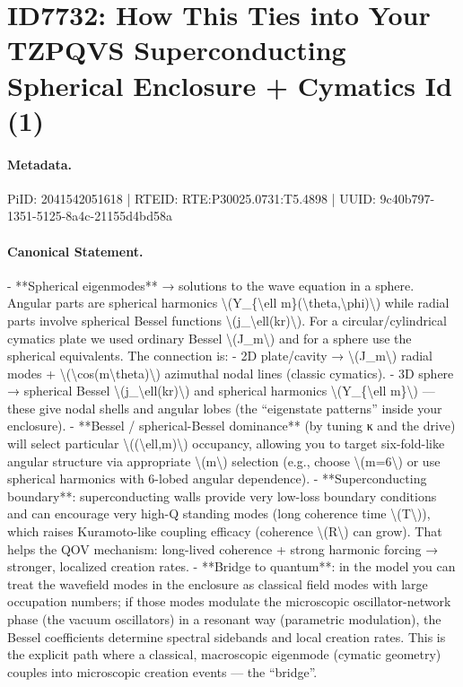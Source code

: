 \section*{ID7732: How This Ties into Your TZPQVS Superconducting Spherical Enclosure + Cymatics Id (1)}
\paragraph{Metadata.}
PiID: 2041542051618 | RTEID: RTE:P30025.0731:T5.4898 | UUID: 9c40b797-1351-5125-8a4c-21155d4bd58a

\paragraph{Canonical Statement.}
- **Spherical eigenmodes** → solutions to the wave equation in a sphere. Angular parts are spherical harmonics \textbackslash{}(Y\_\{\textbackslash{}ell m\}(\textbackslash{}theta,\textbackslash{}phi)\textbackslash{}) while radial parts involve spherical Bessel functions \textbackslash{}(j\_\textbackslash{}ell(kr)\textbackslash{}). For a circular/cylindrical cymatics plate we used ordinary Bessel \textbackslash{}(J\_m\textbackslash{}) and for a sphere use the spherical equivalents. The connection is: - 2D plate/cavity → \textbackslash{}(J\_m\textbackslash{}) radial modes + \textbackslash{}(\textbackslash{}cos(m\textbackslash{}theta)\textbackslash{}) azimuthal nodal lines (classic cymatics). - 3D sphere → spherical Bessel \textbackslash{}(j\_\textbackslash{}ell(kr)\textbackslash{}) and spherical harmonics \textbackslash{}(Y\_\{\textbackslash{}ell m\}\textbackslash{}) — these give nodal shells and angular lobes (the “eigenstate patterns” inside your enclosure). - **Bessel / spherical-Bessel dominance** (by tuning κ and the drive) will select particular \textbackslash{}((\textbackslash{}ell,m)\textbackslash{}) occupancy, allowing you to target six-fold-like angular structure via appropriate \textbackslash{}(m\textbackslash{}) selection (e.g., choose \textbackslash{}(m=6\textbackslash{}) or use spherical harmonics with 6-lobed angular dependence). - **Superconducting boundary**: superconducting walls provide very low-loss boundary conditions and can encourage very high-Q standing modes (long coherence time \textbackslash{}(T\textbackslash{})), which raises Kuramoto-like coupling efficacy (coherence \textbackslash{}(R\textbackslash{}) can grow). That helps the QOV mechanism: long-lived coherence + strong harmonic forcing → stronger, localized creation rates. - **Bridge to quantum**: in the model you can treat the wavefield modes in the enclosure as classical field modes with large occupation numbers; if those modes modulate the microscopic oscillator-network phase (the vacuum oscillators) in a resonant way (parametric modulation), the Bessel coefficients determine spectral sidebands and local creation rates. This is the explicit path where a classical, macroscopic eigenmode (cymatic geometry) couples into microscopic creation events — the “bridge”.


